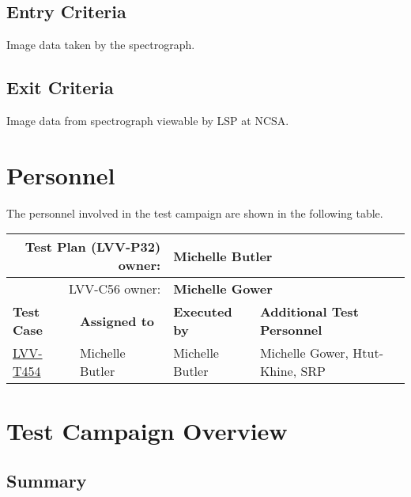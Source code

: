 \documentclass[DM,STR,toc]{lsstdoc}
\begin{document}
  \subsection{Entry Criteria}
  Image data taken by the spectrograph. ~


  \subsection{Exit Criteria}
  Image data from spectrograph viewable by LSP at NCSA.~



\newpage
\section{Personnel}
\label{sect:personnel}

The personnel involved in the test campaign are shown in the following table.

\begin{longtable}{p{3cm}p{3cm}p{3cm}p{6cm}}
\hline
\multicolumn{2}{r}{Test Plan (LVV-P32) owner:} &
\multicolumn{2}{l}{\textbf{ Michelle Butler } }\\\hline
\multicolumn{2}{r}{ LVV-C56 owner:} &
\multicolumn{2}{l}{\textbf{
    Michelle Gower
}
} \\\hline
\textbf{Test Case} & \textbf{Assigned to} & \textbf{Executed by} & \textbf{Additional Test Personnel} \\ \hline
\href{https://jira.lsstcorp.org/secure/Tests.jspa#/testCase/LVV-T454}{LVV-T454}
& {\small Michelle Butler } & {\small Michelle Butler } &
\begin{minipage}[]{6cm}
\smallskip
{\small Michelle Gower, Htut-Khine, SRP
 }
\medskip
\end{minipage}
\\ \hline
\end{longtable}

\newpage

\section{Test Campaign Overview}
\label{sect:overview}

\subsection{Summary}
\label{sect:summarytable}
\end{document}
